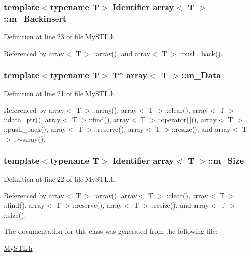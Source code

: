 \subsubsection[{m\_\-Backinsert}]{\setlength{\rightskip}{0pt plus 5cm}template$<$typename T$>$ {\bf Identifier} {\bf array}$<$ T $>$::{\bf m\_\-Backinsert}}\label{classarray_a0424dba081ebfef3032425bad0595d06}


Definition at line 23 of file MySTL.h.



Referenced by array$<$ T $>$::array(), and array$<$ T $>$::push\_\-back().

\subsubsection[{m\_\-Data}]{\setlength{\rightskip}{0pt plus 5cm}template$<$typename T$>$ T$\ast$ {\bf array}$<$ T $>$::{\bf m\_\-Data}}\label{classarray_a6b46d7af0bacf9258f5e8e46b2e42f28}


Definition at line 21 of file MySTL.h.



Referenced by array$<$ T $>$::array(), array$<$ T $>$::clear(), array$<$ T $>$::data\_\-ptr(), array$<$ T $>$::find(), array$<$ T $>$::operator\mbox{[}$\,$\mbox{]}(), array$<$ T $>$::push\_\-back(), array$<$ T $>$::reserve(), array$<$ T $>$::resize(), and array$<$ T $>$::$\sim$array().

\subsubsection[{m\_\-Size}]{\setlength{\rightskip}{0pt plus 5cm}template$<$typename T$>$ {\bf Identifier} {\bf array}$<$ T $>$::{\bf m\_\-Size}}\label{classarray_a9d61b9e3d5ef2caa0aab628414b26d3a}


Definition at line 22 of file MySTL.h.



Referenced by array$<$ T $>$::array(), array$<$ T $>$::clear(), array$<$ T $>$::find(), array$<$ T $>$::reserve(), array$<$ T $>$::resize(), and array$<$ T $>$::size().



The documentation for this class was generated from the following file:\begin{DoxyCompactItemize}
\item 
\hyperlink{MySTL_8h}{MySTL.h}\end{DoxyCompactItemize}
